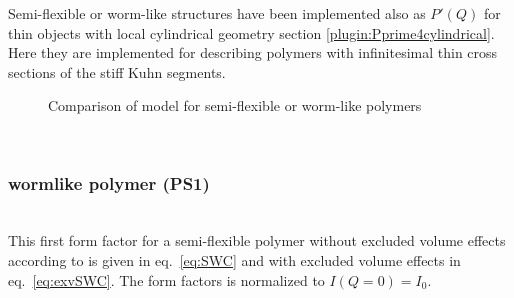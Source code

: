 Semi-flexible or worm-like structures have been implemented also as $P'(Q)$ for thin objects with local cylindrical geometry section  \ref{plugin:Pprime4cylindrical}. Here they are implemented for describing polymers with infinitesimal thin cross sections of the stiff Kuhn segments.
\begin{figure}[htb]
\captionsetup[subfigure]{position=b}
\centering
{}
\hfill
{}
\caption{Comparison of model for semi-flexible or worm-like polymers}
\label{fig_IQ:WormsComparison}
\end{figure}
~\\

\subsubsection{wormlike polymer (PS1)}
\label{sect:ffWorm(PS1)}
~\\
This first form factor for a semi-flexible polymer without excluded volume effects according to \cite{Pedersen96Macrom} is given in eq.\ \ref{eq:SWC} and with excluded volume effects in eq.\ \ref{eq:exvSWC}. The form factors is normalized to $I(Q=0)=I_0$.

